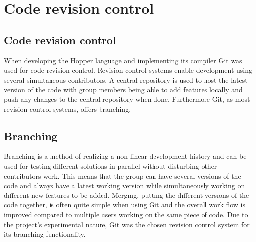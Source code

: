 \section{Code revision control}


\subsection{Code revision control}

When developing the Hopper language and implementing its compiler Git was used for code revision control.
Revision control systems enable development using several simultaneous contributors.
A central repository is used to host the latest version of the code with group members
being able to add features locally and push any changes to the central repository when done.  
Furthermore Git, as most revision control systems, offers branching. 

\subsection{Branching}

Branching is a method of realizing a non-linear development history and can be used for 
testing different solutions in parallel without disturbing other contributors work.
This means that the group can have several versions of the code and always have a
latest working version while simultaneously working on different new features
to be added. Merging, putting the different versions of the code together, is often
quite simple when using Git and the overall work flow is improved compared to
multiple users working on the same piece of code. 
Due to the project's experimental nature, Git was the chosen revision control system 
for its branching functionality.


